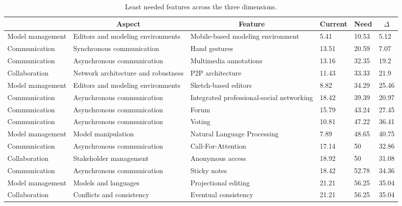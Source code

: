 
  \begin{table*}[]
  \centering
  \notsotiny
  \caption{ Least needed features across the three dimensions.}
\label{tab:least-needed}
\begin{tabular}{|l|l|l|l|l|l|}
  \hline
  \rowcolor[HTML]{C0C0C0}
    \multicolumn{1}{|c|}{Dimension} & \multicolumn{1}{c|}{Aspect} & \multicolumn{1}{c|}{Feature} & \multicolumn{1}{c|}{Current} & \multicolumn{1}{c|}{Need} & \multicolumn{1}{c|}{$\Delta$} \\ \hline
    Model management & Editors and modeling environments & Mobile-based modeling environment & 5.41 & 10.53 & 5.12 \\ \hline 
Communication & Synchronous communication & Hand gestures & 13.51 & 20.59 & 7.07 \\ \hline 
Communication & Asynchronous communication & Multimedia annotations & 13.16 & 32.35 & 19.2 \\ \hline 
Collaboration & Network architecture and robustness & P2P architecture & 11.43 & 33.33 & 21.9 \\ \hline 
Model management & Editors and modeling environments & Sketch-based editors & 8.82 & 34.29 & 25.46 \\ \hline 
Communication & Asynchronous communication & Integrated professional-social networking & 18.42 & 39.39 & 20.97 \\ \hline 
Communication & Asynchronous communication & Forum & 15.79 & 43.24 & 27.45 \\ \hline 
Communication & Asynchronous communication & Voting & 10.81 & 47.22 & 36.41 \\ \hline 
Model management & Model manipulation & Natural Language Processing & 7.89 & 48.65 & 40.75 \\ \hline 
Communication & Asynchronous communication & Call-For-Attention & 17.14 & 50 & 32.86 \\ \hline 
Collaboration & Stakeholder management & Anonymous access & 18.92 & 50 & 31.08 \\ \hline 
Communication & Asynchronous communication & Sticky notes & 18.42 & 52.78 & 34.36 \\ \hline 
Model management & Models and languages & Projectional editing & 21.21 & 56.25 & 35.04 \\ \hline 
Collaboration & Conflicts and consistency & Eventual consistency & 21.21 & 56.25 & 35.04 \\ \hline 

\end{tabular}
\end{table*}
